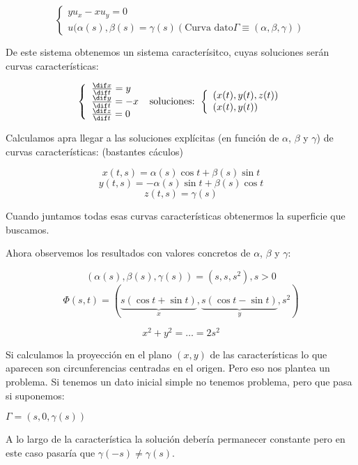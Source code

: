 	\begin{example}{2}

		\begin{equation*}
			\left\{
			\begin{array}{l}
				yu_x - x u_y = 0 \\
				u(\alpha(s),\beta(s) = \gamma(s)
				(\text{Curva dato} \Gamma \equiv (\alpha, \beta, \gamma))
			\end{array}
			\right.
		\end{equation*}

		De este sistema obtenemos un sistema caracterísitco, cuyas soluciones serán curvas características:

		\begin{equation*}
			\left\{
			\begin{array}{l}
				\frac{\dif x}{\dif t} = y \\
				\frac{\dif y}{\dif t} = -x \\
				\frac{\dif z}{\dif t} = 0 \\
			\end{array}
			\right. \text{ soluciones: }
			\left\{
			\begin{array}{l}
				(x(t),y(t),z(t)) \\
				(x(t),y(t))
			\end{array}
			\right.
		\end{equation*}


		Calculamos apra llegar a las soluciones explícitas (en función de $\alpha$, $\beta$ y $\gamma$) de curvas características:
		(bastantes cáculos)

		$$x(t,s) = \alpha(s) \cos t + \beta (s) \sin t$$
		$$y(t,s) = -\alpha(s) \sin t + \beta (s) \cos t$$
		$$z(t,s) = \gamma(s)$$

		Cuando juntamos todas esas curvas características obtenermos la superficie que buscamos.

		Ahora observemos los resultados con valores concretos de $\alpha$, $\beta$ y $\gamma$:

		$$(\alpha(s), \beta(s), \gamma(s)) = (s,s,s^2), s>0$$
		$$\Phi(s,t) = (\underbrace{s(\cos t + \sin t)}_{x}, \underbrace{s(\cos t - \sin t)}_{y},s^2)$$

		$$x^2 + y^2 = … = 2s^2$$


		Si calculamos la proyección en el plano $(x,y)$ de las características lo que aparecen son circunferencias centradas en el origen. Pero eso nos plantea un problema. Si tenemos un dato inicial simple no tenemos problema, pero que pasa si suponemos:

		$\Gamma = (s,0,\gamma(s))$

		A lo largo de la característica la solución debería permanecer constante pero en este caso pasaría que $\gamma(-s) \neq \gamma(s)$.


	\end{example}

